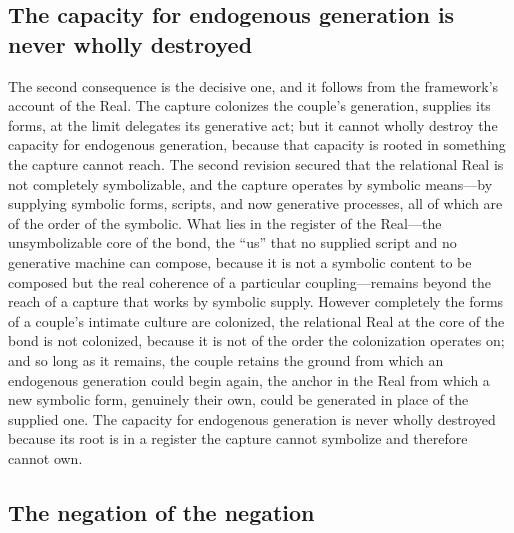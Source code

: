 \subsection*{The capacity for endogenous generation is never wholly destroyed}

The second consequence is the decisive one, and it follows from the framework's account of the Real. The capture colonizes the couple's generation, supplies its forms, at the limit delegates its generative act; but it cannot wholly destroy the capacity for endogenous generation, because that capacity is rooted in something the capture cannot reach. The second revision secured that the relational Real is not completely symbolizable, and the capture operates by symbolic means---by supplying symbolic forms, scripts, and now generative processes, all of which are of the order of the symbolic. What lies in the register of the Real---the unsymbolizable core of the bond, the ``us'' that no supplied script and no generative machine can compose, because it is not a symbolic content to be composed but the real coherence of a particular coupling---remains beyond the reach of a capture that works by symbolic supply. However completely the forms of a couple's intimate culture are colonized, the relational Real at the core of the bond is not colonized, because it is not of the order the colonization operates on; and so long as it remains, the couple retains the ground from which an endogenous generation could begin again, the anchor in the Real from which a new symbolic form, genuinely their own, could be generated in place of the supplied one. The capacity for endogenous generation is never wholly destroyed because its root is in a register the capture cannot symbolize and therefore cannot own.

\subsection*{The negation of the negation}

